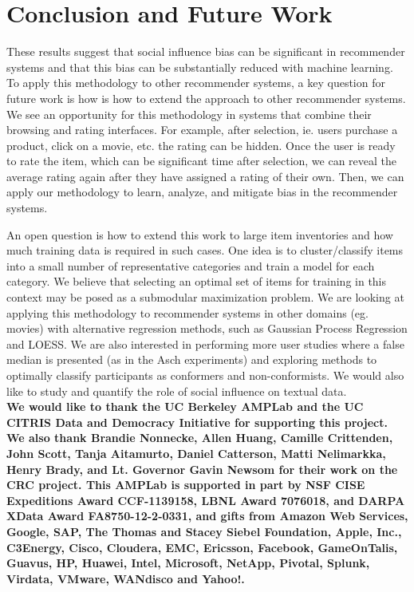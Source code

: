 \section{Conclusion and Future Work}
These results suggest that social influence bias can be significant in
recommender systems and that this bias can be substantially reduced
with machine learning. 
To apply this methodology to other recommender systems, a key question
for future work is how is how to extend the approach to other recommender systems.
We see an opportunity for this methodology in systems that combine their browsing and rating interfaces.
For example, after selection, ie. users purchase a product, click on a movie, etc. the rating can be hidden.
Once the user is ready to rate the item, which can be significant time after selection, we can reveal the average rating again after they have assigned a rating of their own. 
Then, we can apply our methodology to learn, analyze, and mitigate bias in the recommender systems.

An open question is how to extend this work to large item inventories and how much training data is required in such cases.  
One idea is to cluster/classify items into a small number of representative categories and train a model for each category.  
We believe that selecting an optimal set of items for training in this context may be posed as a submodular maximization problem.  
We are looking at applying this methodology to recommender systems in other domains (eg. movies) with alternative regression methods, such as Gaussian Process Regression and LOESS.
We are also interested in performing more user studies where a false median is presented (as in the Asch experiments) and exploring methods to
optimally classify participants as conformers and non-conformists.  
We would also like to study and quantify the role of social influence on textual data.\\
\scriptsize
\textbf{We would like to thank the UC Berkeley AMPLab and the UC CITRIS Data and Democracy Initiative for supporting this project. We also thank Brandie Nonnecke, Allen Huang, Camille Crittenden, John Scott, Tanja Aitamurto, Daniel Catterson, Matti Nelimarkka, Henry Brady, and Lt. Governor Gavin Newsom for their work on the CRC project. This AMPLab is supported in part by NSF CISE Expeditions Award CCF-1139158, LBNL Award 7076018, and DARPA XData Award FA8750-12-2-0331, and  gifts from Amazon Web Services, Google, SAP,  The Thomas and Stacey Siebel Foundation, Apple, Inc., C3Energy, Cisco, Cloudera, EMC, Ericsson, Facebook, GameOnTalis, Guavus, HP, Huawei, Intel, Microsoft, NetApp, Pivotal, Splunk, Virdata, VMware, WANdisco and Yahoo!.}\\





